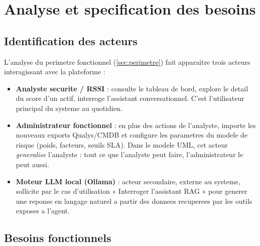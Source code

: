 \chapter{Analyse et specification des besoins}
\label{chap:analyse}

\section{Identification des acteurs}

L'analyse du perimetre fonctionnel (\cref{sec:perimetre}) fait apparaitre trois
acteurs interagissant avec la plateforme :

\begin{itemize}
  \item \textbf{Analyste securite / RSSI} : consulte le tableau de bord, explore le
  detail du score d'un actif, interroge l'assistant conversationnel. C'est
  l'utilisateur principal du systeme au quotidien.
  \item \textbf{Administrateur fonctionnel} : en plus des actions de l'analyste,
  importe les nouveaux exports Qualys/CMDB et configure les parametres du modele de
  risque (poids, facteurs, seuils SLA). Dans le modele UML, cet acteur
  \emph{generalise} l'analyste : tout ce que l'analyste peut faire, l'administrateur
  le peut aussi.
  \item \textbf{Moteur LLM local (Ollama)} : acteur secondaire, externe au systeme,
  sollicite par le cas d'utilisation « Interroger l'assistant RAG » pour generer une
  reponse en langage naturel a partir des donnees recuperees par les outils exposes
  a l'agent.
\end{itemize}

\section{Besoins fonctionnels}

